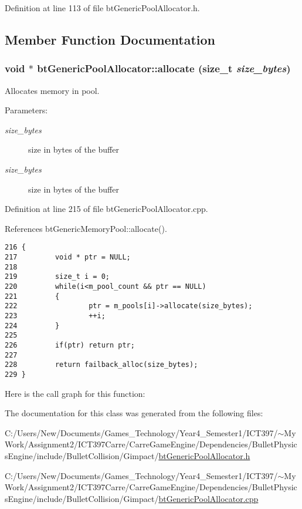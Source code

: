 Definition at line 113 of file btGenericPoolAllocator.h.

\subsection{Member Function Documentation}
\hypertarget{classbt_generic_pool_allocator_e07307fd61ffa9ce47b5f198b87d17e1}{
\subsubsection[allocate]{\setlength{\rightskip}{0pt plus 5cm}void $\ast$ btGenericPoolAllocator::allocate (size\_\-t {\em size\_\-bytes})}}
\label{classbt_generic_pool_allocator_e07307fd61ffa9ce47b5f198b87d17e1}


Allocates memory in pool. 

\begin{Desc}
\item[Parameters:]
\begin{description}
\item[{\em size\_\-bytes}]size in bytes of the buffer\item[{\em size\_\-bytes}]size in bytes of the buffer \end{description}
\end{Desc}


Definition at line 215 of file btGenericPoolAllocator.cpp.

References btGenericMemoryPool::allocate().

\begin{Code}\begin{verbatim}216 {
217         void * ptr = NULL;
218 
219         size_t i = 0;
220         while(i<m_pool_count && ptr == NULL)
221         {
222                 ptr = m_pools[i]->allocate(size_bytes);
223                 ++i;
224         }
225 
226         if(ptr) return ptr;
227 
228         return failback_alloc(size_bytes);
229 }
\end{verbatim}
\end{Code}




Here is the call graph for this function:

The documentation for this class was generated from the following files:\begin{CompactItemize}
\item 
C:/Users/New/Documents/Games\_\-Technology/Year4\_\-Semester1/ICT397/$\sim$My Work/Assignment2/ICT397Carre/CarreGameEngine/Dependencies/BulletPhysicsEngine/include/BulletCollision/Gimpact/\hyperlink{bt_generic_pool_allocator_8h}{btGenericPoolAllocator.h}\item 
C:/Users/New/Documents/Games\_\-Technology/Year4\_\-Semester1/ICT397/$\sim$My Work/Assignment2/ICT397Carre/CarreGameEngine/Dependencies/BulletPhysicsEngine/include/BulletCollision/Gimpact/\hyperlink{bt_generic_pool_allocator_8cpp}{btGenericPoolAllocator.cpp}\end{CompactItemize}
